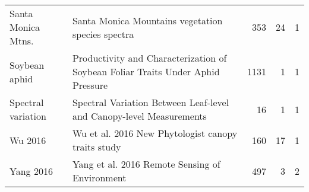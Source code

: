 \begin{table}[H]
\begin{tabular}{l>{\raggedright\arraybackslash}p{25em}rrr}
Santa Monica Mtns. & Santa Monica Mountains vegetation species spectra & 353 & 24 & 1\\
Soybean aphid & Productivity and Characterization of Soybean Foliar Traits Under Aphid Pressure & 1131 & 1 & 1\\
Spectral variation & Spectral Variation Between Leaf-level and Canopy-level Measurements & 16 & 1 & 1\\
\addlinespace
Wu 2016 & Wu et al. 2016 New Phytologist canopy traits study & 160 & 17 & 1\\
Yang 2016 & Yang et al. 2016 Remote Sensing of Environment & 497 & 3 & 2\\
\bottomrule
\end{tabular}\endgroup{}
\end{table}
